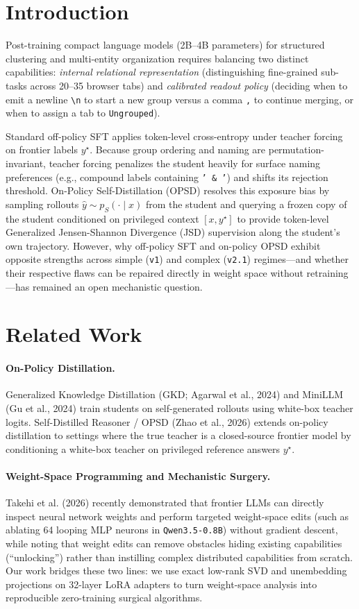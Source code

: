 \documentclass[11pt,a4paper]{article}
\begin{document}
\section{Introduction}
Post-training compact language models (2B--4B parameters) for structured clustering and multi-entity organization requires balancing two distinct capabilities: \emph{internal relational representation} (distinguishing fine-grained sub-tasks across 20--35 browser tabs) and \emph{calibrated readout policy} (deciding when to emit a newline \texttt{\textbackslash n} to start a new group versus a comma \texttt{,} to continue merging, or when to assign a tab to \texttt{Ungrouped}).

Standard off-policy SFT applies token-level cross-entropy under teacher forcing on frontier labels $y^\star$. Because group ordering and naming are permutation-invariant, teacher forcing penalizes the student heavily for surface naming preferences (e.g., compound labels containing \texttt{' \& '}) and shifts its rejection threshold. On-Policy Self-Distillation (OPSD) resolves this exposure bias by sampling rollouts $\hat{y} \sim p_S(\cdot \mid x)$ from the student and querying a frozen copy of the student conditioned on privileged context $[x, y^\star]$ to provide token-level Generalized Jensen-Shannon Divergence (JSD) supervision along the student's own trajectory. However, why off-policy SFT and on-policy OPSD exhibit opposite strengths across simple (\texttt{v1}) and complex (\texttt{v2.1}) regimes—and whether their respective flaws can be repaired directly in weight space without retraining—has remained an open mechanistic question.

\section{Related Work}
\paragraph{On-Policy Distillation.} Generalized Knowledge Distillation (GKD; Agarwal et al., 2024) and MiniLLM (Gu et al., 2024) train students on self-generated rollouts using white-box teacher logits. Self-Distilled Reasoner / OPSD (Zhao et al., 2026) extends on-policy distillation to settings where the true teacher is a closed-source frontier model by conditioning a white-box teacher on privileged reference answers $y^\star$.
\paragraph{Weight-Space Programming and Mechanistic Surgery.} Takehi et al. (2026) recently demonstrated that frontier LLMs can directly inspect neural network weights and perform targeted weight-space edits (such as ablating 64 looping MLP neurons in \texttt{Qwen3.5-0.8B}) without gradient descent, while noting that weight edits can remove obstacles hiding existing capabilities (``unlocking'') rather than instilling complex distributed capabilities from scratch. Our work bridges these two lines: we use exact low-rank SVD and unembedding projections on 32-layer LoRA adapters to turn weight-space analysis into reproducible zero-training surgical algorithms.
\end{document}
